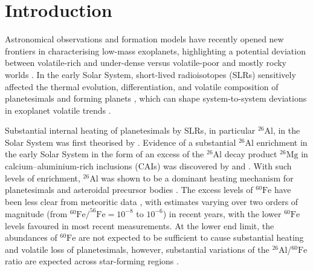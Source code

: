 \documentclass[fleqn,usenatbib]{mnras}
\newcommand{\atom}[2]{$^{#2}\text{#1}$}
\newcommand{\al}{\atom{Al}{26}}
\newcommand{\fe}{\atom{Fe}{60}}
\begin{document}


\section{Introduction}

Astronomical observations \citep{2022MNRAS.511.4551L,2022Sci...377.1211L,2022AJ....164..172D,2023NatAs...7..206P} and formation models \citep{2019PNAS..116.9723Z,2020A&A...643L...1V} have recently opened new frontiers in characterising low-mass exoplanets, highlighting a potential deviation between volatile-rich and under-dense versus volatile-poor and mostly rocky worlds \citep{2021ApJ...922L...4D,Zilinskas2023,2023arXiv230610100P}. In the early Solar System, short-lived radioisotopes (SLRs) sensitively affected the thermal evolution, differentiation, and volatile composition of planetesimals and forming planets \citep{2017pedc.book..115F,2018SSRv..214...39M,2023ASPC..534..907L,2022arXiv220310056K}, which can shape system-to-system deviations in exoplanet volatile trends \citep{lichtenbergWaterBudgetDichotomy2019,2021ApJ...913L..20L}.

Substantial internal heating of planetesimals by SLRs, in particular \al{}, in the Solar System was first theorised by \cite{ureyCosmicAbundancesPotassium1955}.
Evidence of a substantial \al{} enrichment in the early Solar System in the form of an excess of the \al{} decay product \atom{Mg}{26} in calcium–aluminium-rich inclusions (CAIs) was discovered by \citet{grayExcess26MgAllende1974} and \citet{1976GeoRL...3...41L}.
With such levels of enrichment, \al{} was shown to be a dominant heating mechanism for planetesimals and asteroidal precursor bodies \citep{1989Icar...82..244G,grimmHeliocentricZoningAsteroid1993}.  
The excess levels of \fe{} have been less clear from meteoritic data \citep{2012E&PSL.359..248T,2018GeCoA.221..342T,2018ApJ...857L..15T,2021ApJ...917...59C}, with estimates varying over two orders of magnitude (from $^{60}\mathrm{Fe}/^{56}\mathrm{Fe} = 10^{-8}$ to $10^{-6}$) in recent years, with the lower \fe{} levels favoured in most recent measurements. At the lower end limit, the abundances of \fe{} are not expected to be sufficient to cause substantial heating and volatile loss of planetesimals, however, substantial variations of the \al{}/\fe{} ratio are expected across star-forming regions \citep{2013ApJ...769L...8V,2019ApJ...870....3B,2022ApJ...933....1B,2022ApJ...925...56F,2023MNRAS.521.4838P}.
\end{document}
